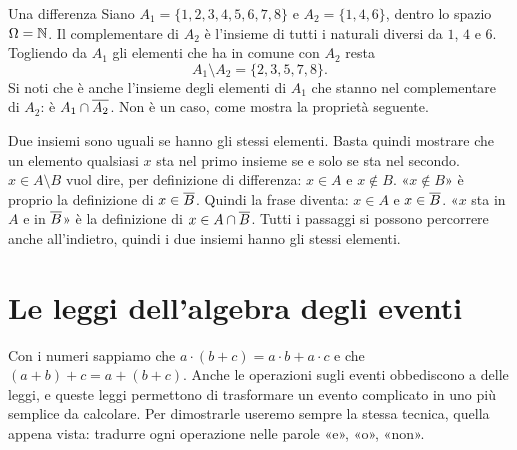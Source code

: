 \begin{esempio}{Una differenza}
Siano $A_1 = \{1, 2, 3, 4, 5, 6, 7, 8\}$ e $A_2 = \{1, 4, 6\}$, dentro lo spazio $\Omega = \mathbb{N}$. Il complementare di
$A_2$ è l'insieme di tutti i naturali diversi da $1$, $4$ e $6$. Togliendo da $A_1$ gli elementi che ha in comune con
$A_2$ resta
\[ A_1 \setminus A_2 = \{2, 3, 5, 7, 8\} . \]
Si noti che è anche l'insieme degli elementi di $A_1$ che stanno nel complementare di $A_2$: è $A_1 \cap
\overline{A_2}$. Non è un caso, come mostra la proprietà seguente.
\end{esempio}


\begin{dimostrazione}
 Due insiemi sono uguali se hanno gli stessi elementi. Basta quindi mostrare che un
elemento qualsiasi $x$ sta nel primo insieme se e solo se sta nel secondo.
 $x \in A \setminus B$ vuol dire, per definizione di differenza: $x \in A$ e
$x \notin B$.
 «$x \notin B$» è proprio la definizione di $x \in \overline{B}$. Quindi la frase
diventa: $x \in A$ e $x \in \overline{B}$.
 «$x$ sta in $A$ e in $\overline{B}$» è la definizione di $x \in A \cap \overline{B}$.
Tutti i passaggi si possono percorrere anche all'indietro, quindi i due insiemi hanno gli stessi elementi.
\end{dimostrazione}

\section{Le leggi dell'algebra degli eventi}

Con i numeri sappiamo che $a \cdot (b + c) = a \cdot b + a \cdot c$ e che $(a + b) + c = a + (b + c)$. Anche le
operazioni sugli eventi obbediscono a delle leggi, e queste leggi permettono di trasformare un evento complicato in uno
più semplice da calcolare. Per dimostrarle useremo sempre la stessa tecnica, quella appena vista: tradurre ogni
operazione nelle parole «e», «o», «non».

